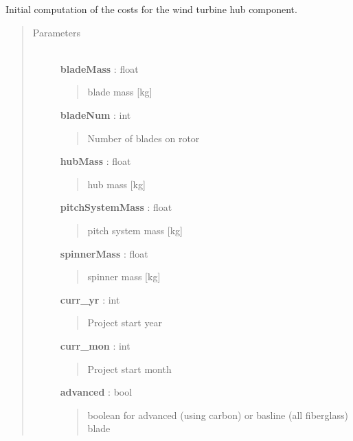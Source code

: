 \documentclass[letterpaper,10pt,openany,oneside]{sphinxmanual}
\begin{document}
\begin{fulllineitems}
\label{documentation:turbine_costSE.src.rotor_costsSE.RotorCost}
Initial computation of the costs for the wind turbine hub component.
\begin{quote}\begin{description}
\item[{Parameters }] \leavevmode\\
\textbf{bladeMass} : float
\begin{quote}

blade mass {[}kg{]}
\end{quote}

\textbf{bladeNum} : int
\begin{quote}

Number of blades on rotor
\end{quote}

\textbf{hubMass} : float
\begin{quote}

hub mass {[}kg{]}
\end{quote}

\textbf{pitchSystemMass} : float
\begin{quote}

pitch system mass {[}kg{]}
\end{quote}

\textbf{spinnerMass} : float
\begin{quote}

spinner mass {[}kg{]}
\end{quote}

\textbf{curr\_yr} : int
\begin{quote}

Project start year
\end{quote}

\textbf{curr\_mon} : int
\begin{quote}

Project start month
\end{quote}

\textbf{advanced} : bool
\begin{quote}

boolean for advanced (using carbon) or basline (all fiberglass) blade
\end{quote}

\end{description}\end{quote}

\end{fulllineitems}
\end{document}
